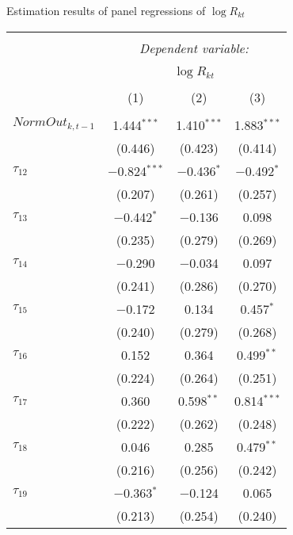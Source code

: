   \caption{Estimation results of panel regressions of $\log R_{kt}$} 
  \label{} 
\small 
\begin{tabular}{@{\extracolsep{5pt}}lccc} 
\\[-1.8ex]\hline 
\hline \\[-1.8ex] 
 & \multicolumn{3}{c}{\textit{Dependent variable:}} \\ 
\cline{2-4} 
\\[-1.8ex] & \multicolumn{3}{c}{$\log R_{kt}$} \\ 
\\[-1.8ex] & (1) & (2) & (3)\\ 
\hline \\[-1.8ex] 
 $NormOut_{k,t-1}$ & 1.444$^{***}$ & 1.410$^{***}$ & 1.883$^{***}$ \\ 
  & (0.446) & (0.423) & (0.414) \\ 
   
 $\tau_{12}$ & $-$0.824$^{***}$ & $-$0.436$^{*}$ & $-$0.492$^{*}$ \\ 
  & (0.207) & (0.261) & (0.257) \\ 
   
 $\tau_{13}$ & $-$0.442$^{*}$ & $-$0.136 & 0.098 \\ 
  & (0.235) & (0.279) & (0.269) \\ 
   
 $\tau_{14}$ & $-$0.290 & $-$0.034 & 0.097 \\ 
  & (0.241) & (0.286) & (0.270) \\ 
   
 $\tau_{15}$ & $-$0.172 & 0.134 & 0.457$^{*}$ \\ 
  & (0.240) & (0.279) & (0.268) \\ 
   
 $\tau_{16}$ & 0.152 & 0.364 & 0.499$^{**}$ \\ 
  & (0.224) & (0.264) & (0.251) \\ 
   
 $\tau_{17}$ & 0.360 & 0.598$^{**}$ & 0.814$^{***}$ \\ 
  & (0.222) & (0.262) & (0.248) \\ 
   
 $\tau_{18}$ & 0.046 & 0.285 & 0.479$^{**}$ \\ 
  & (0.216) & (0.256) & (0.242) \\ 
   
 $\tau_{19}$ & $-$0.363$^{*}$ & $-$0.124 & 0.065 \\ 
  & (0.213) & (0.254) & (0.240) \\ 
   

\end{tabular}

